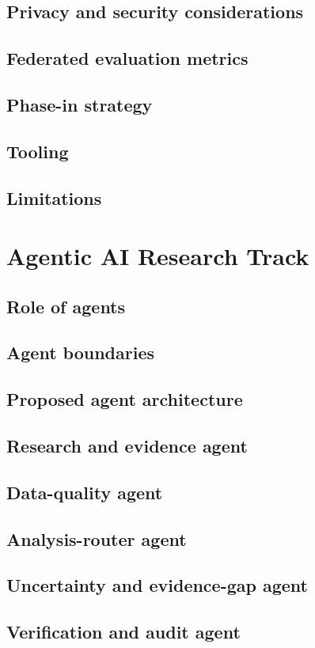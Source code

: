\documentclass[11pt,journal,onecolumn,draftclsnofoot]{IEEEtran}
\begin{document}
\subsection{Privacy and security considerations}
\subsection{Federated evaluation metrics}
\subsection{Phase-in strategy}
\subsection{Tooling}
\subsection{Limitations}

\section{Agentic AI Research Track}
\subsection{Role of agents}
\subsection{Agent boundaries}
\subsection{Proposed agent architecture}
\subsection{Research and evidence agent}
\subsection{Data-quality agent}
\subsection{Analysis-router agent}
\subsection{Uncertainty and evidence-gap agent}
\subsection{Verification and audit agent}
\end{document}
